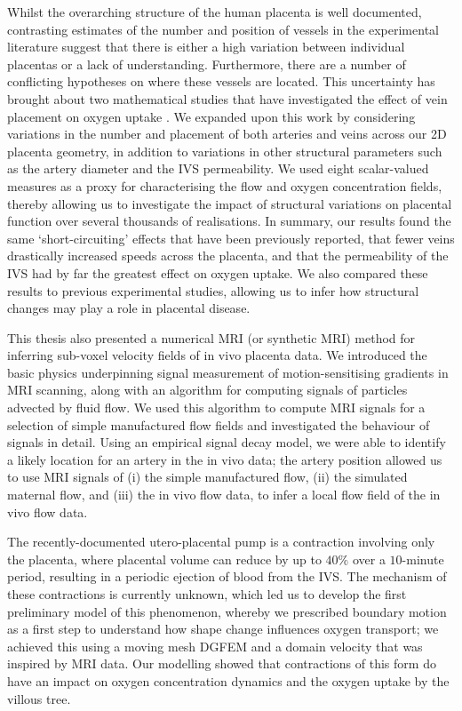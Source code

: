         Whilst the overarching structure of the human placenta is well documented, contrasting estimates of the number and position of vessels in the experimental literature suggest that there is either a high variation between individual placentas or a lack of understanding. Furthermore, there are a number of conflicting hypotheses on where these vessels are located. This uncertainty has brought about two mathematical studies that have investigated the effect of vein placement on oxygen uptake \cite{chernyavskyMathematicalModelIntervillous2010,meklerImpactTissuePorosity2022}. We expanded upon this work by considering variations in the number and placement of both arteries and veins across our 2D placenta geometry, in addition to variations in other structural parameters such as the artery diameter and the IVS permeability. We used eight scalar-valued measures as a proxy for characterising the flow and oxygen concentration fields, thereby allowing us to investigate the impact of structural variations on placental function over several thousands of realisations. In summary, our results found the same `short-circuiting' effects that have been previously reported, that fewer veins drastically increased speeds across the placenta, and that the permeability of the IVS had by far the greatest effect on oxygen uptake. We also compared these results to previous experimental studies, allowing us to infer how structural changes may play a role in placental disease.

        This thesis also presented a numerical MRI (or synthetic MRI) method for inferring sub-voxel velocity fields of in vivo placenta data. We introduced the basic physics underpinning signal measurement of motion-sensitising gradients in MRI scanning, along with an algorithm for computing signals of particles advected by fluid flow. We used this algorithm to compute MRI signals for a selection of simple manufactured flow fields and investigated the behaviour of signals in detail. Using an empirical signal decay model, we were able to identify a likely location for an artery in the in vivo data; the artery position allowed us to use MRI signals of (i) the simple manufactured flow, (ii) the simulated maternal flow, and (iii) the in vivo flow data, to infer a local flow field of the in vivo flow data.

        The recently-documented utero-placental pump is a contraction involving only the placenta, where placental volume can reduce by up to $40\%$ over a $10$-minute period, resulting in a periodic ejection of blood from the IVS. The mechanism of these contractions is currently unknown, which led us to develop the first preliminary model of this phenomenon, whereby we prescribed boundary motion as a first step to understand how shape change influences oxygen transport; we achieved this using a moving mesh DGFEM and a domain velocity that was inspired by MRI data. Our modelling showed that contractions of this form do have an impact on oxygen concentration dynamics and the oxygen uptake by the villous tree.

